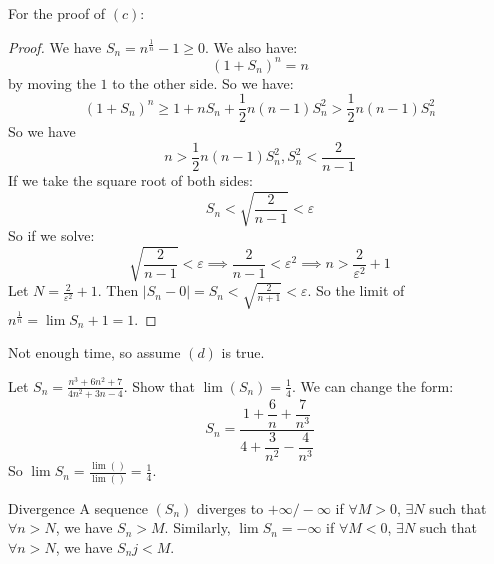 \documentclass{report}
\begin{document}
For the proof of $(c)$:
    \begin{proof}
        We have $S_{n} = n^{\frac{1}{n}} - 1 \geq 0$. We also have:
            \begin{equation*}
                (1 + S_{n})^{n} = n
            \end{equation*}
        by moving the $1$ to the other side. So we have:
            \begin{equation*}
                (1 + S_{n})^{n} \geq 1 + nS_{n} + \dfrac{1}{2}n(n - 1)S_{n}^{2} > \dfrac{1}{2}n(n - 1)S_{n}^{2}
            \end{equation*}
        So we have
            \begin{equation*}
                n >  \dfrac{1}{2}n(n - 1)S_{n}^{2}, S_{n}^{2} <  \dfrac{2}{n - 1} 
            \end{equation*}
        If we take the square root of both sides:
            \begin{equation*}
                S_{n} < \sqrt{\dfrac{2}{n - 1}} < \varepsilon
            \end{equation*}
        So if we solve:
            \begin{equation*}
                \sqrt{\dfrac{2}{n - 1}} < \varepsilon \implies \dfrac{2}{n - 1} <  \varepsilon^{2} \implies n > \dfrac{2}{\varepsilon^{2}} + 1
            \end{equation*}
        Let $N = \frac{2}{\varepsilon^{2}} + 1$. Then $\lvert S_{n} - 0 \rvert = S_{n} < \sqrt{\frac{2}{n + 1}} <  \varepsilon$. So the limit of $n^{\frac{1}{n}} = \lim S_{n} + 1  = 1$.
    \end{proof}
Not enough time, so assume $(d)$ is true.

\begin{examples}
    \begin{example}
        Let $S_{n} = \frac{n^{3} + 6n^{2} + 7}{4n^{2} + 3n - 4}$. Show that $\lim (S_{n}) = \frac{1}{4}$. We can change the form:
            \begin{equation*}
                S_{n} = \dfrac{1 + \dfrac{6}{n} + \dfrac{7}{n^{3}}}{4 + \dfrac{3}{n^{2}} - \dfrac{4}{n^{3}}}
            \end{equation*}
        So $\lim S_{n} = \frac{\lim ()}{\lim ()} = \frac{1}{4}$.
    \end{example}
\end{examples}

\begin{definition}{Divergence}
    A sequence $(S_{n})$ diverges to $ + \infty/ - \infty$ if $\forall M > 0$, $\exists N$ such that $\forall n >  N$, we have $S_{n} >  M$. Similarly, $\lim S_{n} = -\infty$ if $\forall M <  0$, $\exists N$ such that $\forall n > N$, we have $S_{n}j < M$.
\end{definition}
\end{document}
